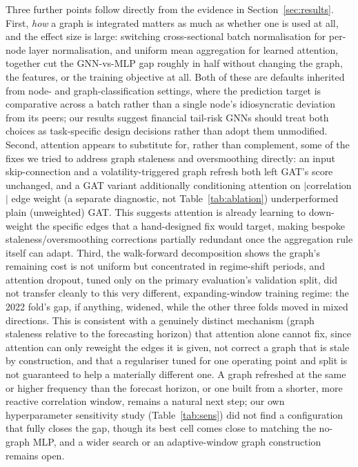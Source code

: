 \documentclass{llncs}
\begin{document}
Three further points follow directly from the evidence in
Section~\ref{sec:results}. First, \emph{how} a graph is integrated matters as
much as whether one is used at all, and the effect size is large: switching
cross-sectional batch normalisation for per-node layer normalisation, and
uniform mean aggregation for learned attention, together cut the GNN-vs-MLP
gap roughly in half without changing the graph, the features, or the training
objective at all. Both of these are defaults inherited from node- and
graph-classification settings, where the prediction target is comparative
across a batch rather than a single node's idiosyncratic deviation from its
peers; our results suggest financial tail-risk GNNs should treat both choices
as task-specific design decisions rather than adopt them unmodified. Second,
attention appears to substitute for, rather than complement, some of the fixes
we tried to address graph staleness and oversmoothing directly: an
input skip-connection and a volatility-triggered graph refresh both left
GAT's score unchanged, and a GAT variant additionally conditioning attention
on $|$correlation$|$ edge weight (a separate diagnostic, not
Table~\ref{tab:ablation}) underperformed plain (unweighted) GAT. This suggests
attention is already
learning to down-weight the specific edges that a hand-designed fix would
target, making bespoke staleness/oversmoothing corrections partially redundant
once the aggregation rule itself can adapt. Third, the walk-forward
decomposition shows the graph's remaining cost is not uniform but concentrated
in regime-shift periods, and attention dropout, tuned only on the primary
evaluation's validation split, did not transfer cleanly to this very
different, expanding-window training regime: the 2022 fold's gap, if
anything, widened, while the other three folds moved in mixed directions.
This is consistent with a genuinely distinct mechanism (graph staleness
relative to the forecasting horizon) that attention alone cannot fix, since
attention can only reweight the edges it is given, not correct a graph that
is stale by construction, and that a regulariser tuned for one operating
point and split is not guaranteed to help a materially different one. A graph
refreshed at
the same or higher frequency than the forecast horizon, or one built from a
shorter, more reactive correlation window, remains a natural next step; our
own hyperparameter sensitivity study (Table~\ref{tab:sens}) did not find a
configuration that fully closes the gap, though its best cell comes close to
matching the no-graph MLP, and a wider search or an adaptive-window graph
construction remains open.
\end{document}
